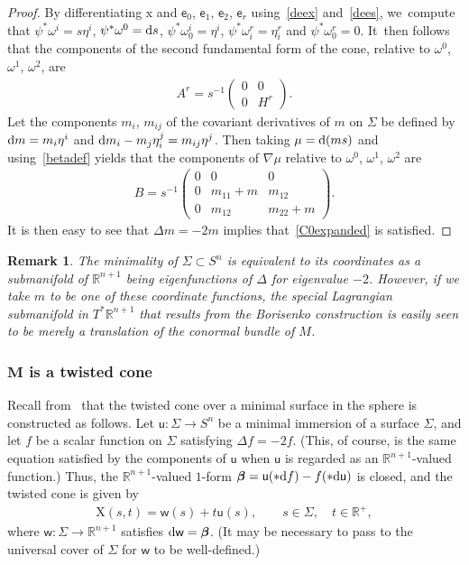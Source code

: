 \documentclass[pdftex]{sigma}
\def\R{\mathbb{R}}
\def\ve{\mathsf{e}}
\def\vx{\boldsymbol{\mathrm{x}}}
\def\vw{\mathsf{w}}
\def\vu{\mathsf{u}}
\def\vbeta{\boldsymbol{\beta}}
\def\vX{\boldsymbol{\mathrm{X}}}
\def\w{\omega}
\newtheorem{Remark}[Theorem]{Remark}}
\numberwithin{equation}{section}
\begin{document}
\begin{proof}
By differentiating $\vx$ and $\ve_0$, $\ve_1$, $\ve_2$, $\ve_r$ using~\eqref{deex} and~\eqref{dees}, we~compute that $\psi^* \w^i = s \eta^i$, $\psi^*\w^0 = {\rm d}s$, $\psi^* \w^i_0 = \eta^i$, $\psi^* \w^r_i = \eta^r_i$ and $\psi^* \w^r_0 = 0$. It~then follows that the components of the second fundamental form of the cone, relative to $\w^0$, $\w^1$, $\w^2$, are
\begin{gather*}
A^r = s^{-1}\begin{pmatrix} 0 & 0 \\ 0 & H^r \end{pmatrix} .
\end{gather*}
Let the components $m_i$, $m_{ij}$ of the covariant derivatives of $m$ on $\Sigma$ be defined by ${\rm d}m = m_i \eta^i$ and ${\rm d}m_i - m_j \eta^j_i = m_{ij} \eta^j$. Then taking $\mu = {\rm d}(ms)$ and using~\eqref{betadef} yields that the components of $\nabla\mu$ relative to $\w^0$, $\w^1$, $\w^2$ are
\begin{gather*}
B = s^{-1}\begin{pmatrix} 0 & 0 & 0 \\
0 & m_{11}+m & m_{12} \\ 0 & m_{12} & m_{22} + m \end{pmatrix} .
\end{gather*}
It is then easy to see that $\Delta m = - 2 m$ implies that~\eqref{C0expanded} is satisfied.
\end{proof}

\begin{Remark}
The minimality of $\Sigma \subset S^n$ is equivalent to its coordinates as a submanifold of $\R^{n+1}$ being eigenfunctions of $\Delta$ for eigenvalue $-2$. However, if we take $m$ to be one of these coordinate functions, the special Lagrangian submanifold in $T^* \R^{n+1}$ that results from the Borisenko construction is easily seen to be merely a translation of the conormal bundle of $M$.
\end{Remark}

\subsubsection[M is a twisted cone]
{$\boldsymbol M$ is a twisted cone} \label{twistconesec}

Recall from~\cite{Br} that the twisted cone over a minimal surface in the sphere is constructed as follows. Let $\vu\colon \Sigma \to S^n$ be a minimal immersion of a surface $\Sigma$, and let $f$ be a scalar function on $\Sigma$ satisfying $\Delta f = -2f$. (This, of course, is the same equation satisfied by the components of $\vu$ when $\vu$ is regarded as an $\R^{n+1}$-valued function.) Thus, the $\R^{n+1}$-valued $1$-form $\vbeta = \vu (*{\rm d}f) - f (*{\rm d}\vu)$ is closed, and the twisted cone is given by
\begin{gather} \label{twistyform}
\vX(s,t) = \vw(s) + t \vu(s), \qquad
s\in \Sigma, \quad t\in\R^+,
\end{gather}
where $\vw\colon \Sigma \to \R^{n+1}$ satisfies ${\rm d}\vw = \vbeta$. (It may be necessary to pass to the universal cover of $\Sigma$ for $\vw$ to be well-defined.)
\end{document}
